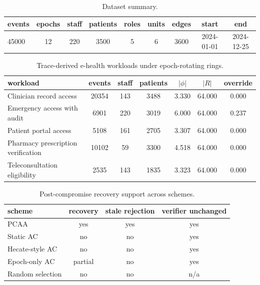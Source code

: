 \begin{table}[htbp]
\centering
\caption{Dataset summary.}
\label{tab:dataset-summary}
\begin{tabular}{@{}lcccccccc@{}}
\toprule
events & epochs & staff & patients & roles & units & edges & start & end \\
\midrule
45000 & 12 & 220 & 3500 & 5 & 6 & 3600 & 2024-01-01 & 2024-12-25 \\
\bottomrule
\end{tabular}
\end{table}


\begin{table}[htbp]
\centering
\caption{Trace-derived e-health workloads under epoch-rotating rings.}
\label{tab:ehealth-workloads}
\begin{tabular}{@{}lcccccc@{}}
\toprule
workload & events & staff & patients & $|\phi|$ & $|R|$ & override \\
\midrule
Clinician record access & 20354 & 143 & 3488 & 3.330 & 64.000 & 0.000 \\
Emergency access with audit & 6901 & 220 & 3019 & 6.000 & 64.000 & 0.237 \\
Patient portal access & 5108 & 161 & 2705 & 3.307 & 64.000 & 0.000 \\
Pharmacy prescription verification & 10102 & 59 & 3300 & 4.518 & 64.000 & 0.000 \\
Teleconsultation eligibility & 2535 & 143 & 1835 & 3.323 & 64.000 & 0.000 \\
\bottomrule
\end{tabular}
\end{table}


\begin{table}[htbp]
\centering
\caption{Post-compromise recovery support across schemes.}
\label{tab:recovery-baseline}
\begin{tabular}{@{}lccc@{}}
\toprule
scheme & recovery & stale rejection & verifier unchanged \\
\midrule
PCAA & yes & yes & yes \\
Static AC & no & no & yes \\
Hecate-style AC & no & no & yes \\
Epoch-only AC & partial & no & yes \\
Random selection & no & no & n/a \\
\bottomrule
\end{tabular}
\end{table}



